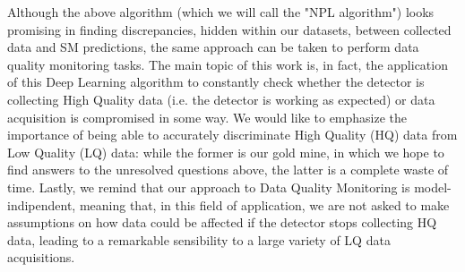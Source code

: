 Although the above algorithm (which we will call the "NPL algorithm") looks promising in finding discrepancies, hidden
within our datasets, between collected data and SM predictions, the same approach can be taken to perform data quality
monitoring tasks. The main topic of this work is, in fact, the application of this Deep Learning algorithm to constantly
check whether the detector is collecting High Quality data (i.e. the detector is working as expected) or data
acquisition is compromised in some way. We would like to emphasize the importance of being able to accurately
discriminate High Quality (HQ) data from Low Quality (LQ) data: while the former is our gold mine, in which we hope to find
answers to the unresolved questions above, the latter is a complete waste of time. Lastly, we remind that our approach
to Data Quality Monitoring is model-indipendent, meaning that, in this field of application, we are not asked to make
assumptions on how data could be affected if the detector stops collecting HQ data, leading to a remarkable sensibility
to a large variety of LQ data acquisitions.







